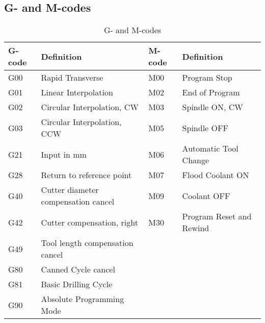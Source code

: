 \section*{}
 \appendix
 \subsection{G- and M-codes}
 \begin{table}[!h]
 	\caption[G- and M-Codes]{G- and M-codes}

 \begin{center}
 \centering
 \begin{tabular}{|l|l|l|l|}
 \hline
 \textbf{G-code} & \textbf{Definition} &\textbf{ M-code} & \textbf{Definition}\\
 \hline
 
 G00 & Rapid Transverse & M00 & Program Stop\\
 G01 & Linear Interpolation &  M02 & End of Program \\
 G02 & Circular Interpolation, CW & M03 & Spindle ON, CW \\
 G03 & Circular Interpolation, CCW& M05 & Spindle OFF \\
 G21 & Input in mm & M06 & Automatic Tool Change\\
 G28 & Return to reference point & M07 & Flood Coolant ON \\
 G40 & Cutter diameter compensation cancel&M09 & Coolant OFF\\
 G42 & Cutter compensation, right &  M30 & Program Reset and Rewind\\
 G49 & Tool length compensation cancel &&\\
 G80 & Canned Cycle cancel&&\\
 G81 & Basic Drilling Cycle&&\\
 G90 & Absolute Programming Mode&&\\
 \hline
 \end{tabular}
 \end{center}
 \end{table}
